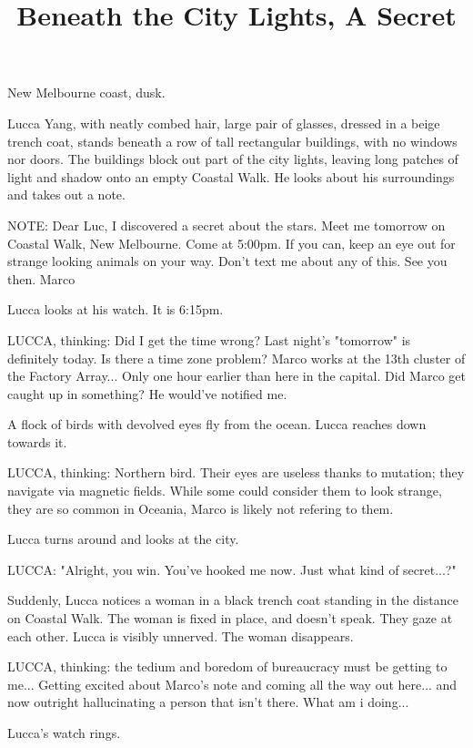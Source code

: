 \documentclass[11pt]{article}
\begin{document}
\ttfamily
\title{Beneath the City Lights, A Secret}
\maketitle

New Melbourne coast, dusk.

Lucca Yang, with neatly combed hair, large pair of glasses, dressed in a beige trench coat, stands beneath a row of tall rectangular buildings, with no windows nor doors. 
The buildings block out part of the city lights, leaving long patches of light and shadow onto an empty Coastal Walk.
He looks about his surroundings and takes out a note.

NOTE: Dear Luc, I discovered a secret about the stars. 
Meet me tomorrow on Coastal Walk, New Melbourne. Come at 5:00pm.
If you can, keep an eye out for strange looking animals on your way. 
Don't text me about any of this. See you then.
Marco

Lucca looks at his watch. It is 6:15pm. 

LUCCA, thinking: Did I get the time wrong? Last night's "tomorrow" is definitely today. 
Is there a time zone problem? Marco works at the 13th cluster of the Factory Array... Only one hour earlier than here in the capital. 
Did Marco get caught up in something? He would've notified me.

A flock of birds with devolved eyes fly from the ocean. Lucca reaches down towards it.

LUCCA, thinking: Northern bird. Their eyes are useless thanks to mutation; they navigate via magnetic fields. While some could consider them to look strange, they are so common in Oceania, Marco is likely not refering to them. 

Lucca turns around and looks at the city.

LUCCA: "Alright, you win. You've hooked me now. Just what kind of secret...?"

Suddenly, Lucca notices a woman in a black trench coat standing in the distance on Coastal Walk. The woman is fixed in place, and doesn't speak. They gaze at each other. Lucca is visibly unnerved. The woman disappears. 

LUCCA, thinking: the tedium and boredom of bureaucracy must be getting to me... Getting excited about Marco's note and coming all the way out here... and now outright hallucinating a person that isn't there. What am i doing...

Lucca's watch rings. 
\end{document}
